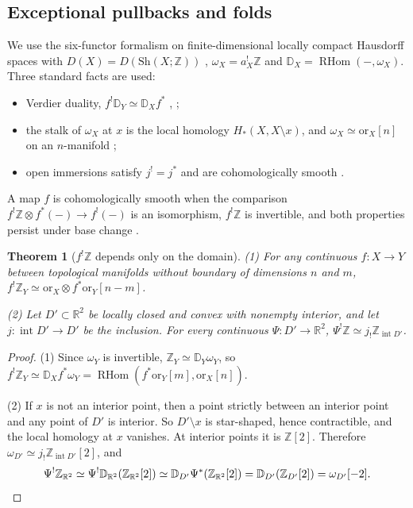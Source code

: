 \documentclass[11pt]{article}
\newtheorem{theorem}{Theorem}[section]
\theoremstyle{definition}\newtheorem{definition}[theorem]{Definition}
\theoremstyle{remark}\newtheorem{remark}[theorem]{Remark}
\newcommand{\R}{\mathbb R}\newcommand{\C}{\mathbb C}\newcommand{\Z}{\mathbb Z}
\newcommand{\RHom}{\operatorname{RHom}}\newcommand{\End}{\operatorname{End}}\newcommand{\Hom}{\operatorname{Hom}}
\newcommand{\inte}{\operatorname{int}}\newcommand{\orr}{\mathrm{or}}
\begin{document}
\subsection{Exceptional pullbacks and folds}
We use the six-functor formalism on finite-dimensional locally compact
Hausdorff spaces with $D(X)=D(\mathrm{Sh}(X;\Z))$ \cite[Ex.~5.9]{scholze},
$\omega_X=a_X^!\Z$ and $\mathbb D_X=\RHom(-,\omega_X)$. Three standard facts
are used:
\begin{itemize}
\item Verdier duality, $f^!\mathbb D_Y\simeq\mathbb D_Xf^*$
\cite[Prop.~4.6.9]{knp}, \cite[Ch.~III]{ks};
\item the stalk of $\omega_X$ at $x$ is the local homology $H_*(X,X\setminus x)$,
and $\omega_X\simeq\orr_X[n]$ on an $n$-manifold \cite[Rem.~4.6.19, Cor.~4.6.20]{knp};
\item open immersions satisfy $j^!=j^*$ and are cohomologically smooth
\cite[Rem.~5.4]{scholze}.
\end{itemize}
A map $f$ is cohomologically smooth when the comparison
$f^!\Z\otimes f^*(-)\to f^!(-)$ is an isomorphism, $f^!\Z$ is invertible, and
both properties persist under base change \cite[Def.~5.1]{scholze}.

\begin{theorem}[$f^!\Z$ depends only on the domain]\label{thm:shriek}
(1) For any continuous $f:X\to Y$ between topological manifolds without
boundary of dimensions $n$ and $m$, $f^!\Z_Y\simeq\orr_X\otimes f^*\orr_Y[n-m]$.

(2) Let $D'\subset\R^2$ be locally closed and convex with nonempty interior,
and let $j:\inte D'\to D'$ be the inclusion. For every continuous
$\Psi:D'\to\R^2$, $\Psi^!\Z\simeq j_!\Z_{\inte D'}$.
\end{theorem}
\begin{proof}
(1) Since $\omega_Y$ is invertible, $\Z_Y\simeq\mathbb D_Y\omega_Y$, so
$f^!\Z_Y\simeq\mathbb D_Xf^*\omega_Y=\RHom(f^*\orr_Y[m],\orr_X[n])$.

(2) If $x$ is not an interior point, then a point strictly between an interior
point and any point of $D'$ is interior. So $D'\setminus x$ is star-shaped,
hence contractible, and the local homology at $x$ vanishes. At interior points
it is $\Z[2]$. Therefore $\omega_{D'}\simeq j_!\Z_{\inte D'}[2]$, and
\[
 \Psi^!\Z_{\R^2}\simeq\Psi^!\mathbb D_{\R^2}(\Z_{\R^2}[2])
 \simeq\mathbb D_{D'}\Psi^*(\Z_{\R^2}[2])=\mathbb D_{D'}(\Z_{D'}[2])=\omega_{D'}[-2].
 \qedhere
\]
\end{proof}
\end{document}
